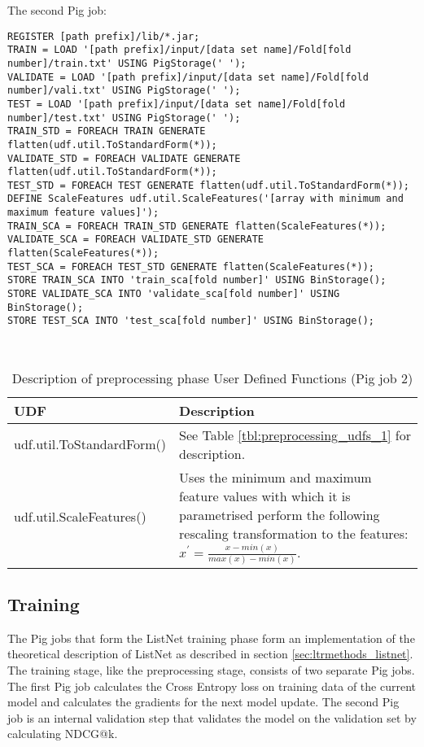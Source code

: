 The second Pig job:\\
\begin{minipage}{\linewidth}
\begin{lstlisting}
REGISTER [path prefix]/lib/*.jar;
TRAIN = LOAD '[path prefix]/input/[data set name]/Fold[fold number]/train.txt' USING PigStorage(' ');
VALIDATE = LOAD '[path prefix]/input/[data set name]/Fold[fold number]/vali.txt' USING PigStorage(' ');
TEST = LOAD '[path prefix]/input/[data set name]/Fold[fold number]/test.txt' USING PigStorage(' ');
TRAIN_STD = FOREACH TRAIN GENERATE flatten(udf.util.ToStandardForm(*));
VALIDATE_STD = FOREACH VALIDATE GENERATE flatten(udf.util.ToStandardForm(*));
TEST_STD = FOREACH TEST GENERATE flatten(udf.util.ToStandardForm(*));
DEFINE ScaleFeatures udf.util.ScaleFeatures('[array with minimum and maximum feature values]');
TRAIN_SCA = FOREACH TRAIN_STD GENERATE flatten(ScaleFeatures(*));
VALIDATE_SCA = FOREACH VALIDATE_STD GENERATE flatten(ScaleFeatures(*));
TEST_SCA = FOREACH TEST_STD GENERATE flatten(ScaleFeatures(*));
STORE TRAIN_SCA INTO 'train_sca[fold number]' USING BinStorage();
STORE VALIDATE_SCA INTO 'validate_sca[fold number]' USING BinStorage();
STORE TEST_SCA INTO 'test_sca[fold number]' USING BinStorage();
\end{lstlisting}
\end{minipage}\\

\begin{table}
\centering
\begin{tabular}{p{5cm}p{8cm}}\toprule
UDF & Description \\
\midrule
udf.util.ToStandardForm() & See Table \ref{tbl:preprocessing_udfs_1} for description.\\
udf.util.ScaleFeatures() & Uses the minimum and maximum feature values with which it is parametrised perform the following rescaling transformation to the features: $x^{'} = \frac{x-min(x)}{max(x)-min(x)}$.\\
\bottomrule
\end{tabular}
\caption{Description of preprocessing phase User Defined Functions (Pig job 2)}
\label{tbl:preprocessing_udfs_2}
\end{table}

\subsection{Training}
The Pig jobs that form the ListNet training phase form an implementation of the theoretical description of ListNet as described in section \ref{sec:ltrmethods_listnet}. The training stage, like the preprocessing stage, consists of two separate Pig jobs. The first Pig job calculates the Cross Entropy loss on training data of the current model and calculates the gradients for the next model update. The second Pig job is an internal validation step that validates the model on the validation set by calculating \ac{NDCG}@k.\\

